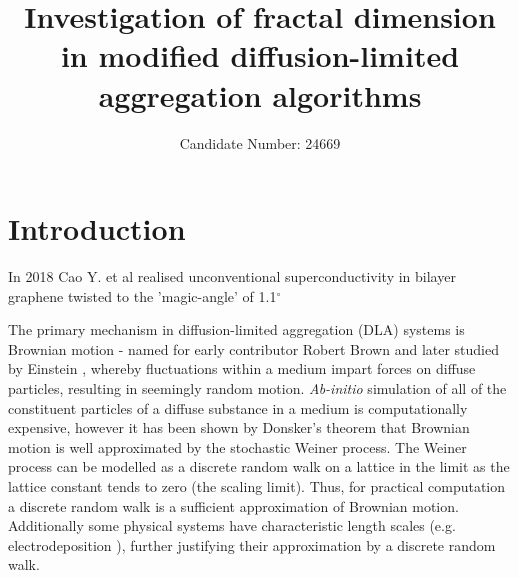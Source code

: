 \documentclass[10pt, twocolumn]{article} %
\title{\textbf{Investigation of fractal dimension in modified diffusion-limited aggregation algorithms}}
\author{Candidate Number: 24669}
\affil{Department of Physics, University of Bath, Bath BA2 7AY, United Kingdom}
\begin{document}
\medskip

\section*{Introduction}

  In 2018 Cao Y. et al\cite{Cao_2018} realised unconventional superconductivity in bilayer graphene twisted to the 'magic-angle' of 1.1$^\circ$ 

  The primary mechanism in diffusion-limited aggregation (DLA) systems is Brownian motion - named for early contributor Robert Brown \cite{Pearle_2010} and later studied by Einstein \cite{Einstein_1905}, whereby fluctuations within a medium impart forces on diffuse particles, resulting in seemingly random motion. \textit{Ab-initio} simulation of all of the constituent particles of a diffuse substance in a medium is computationally expensive, however it has been shown by Donsker's theorem that Brownian motion is well approximated by the stochastic Weiner process. The Weiner process can be modelled as a discrete random walk on a lattice in the limit as the lattice constant tends to zero (the scaling limit). Thus, for practical computation a discrete random walk is a sufficient approximation of Brownian motion. Additionally some physical systems have characteristic length scales (e.g. electrodeposition \cite{Shaikh_2022}), further justifying their approximation by a discrete random walk.
\end{document}
